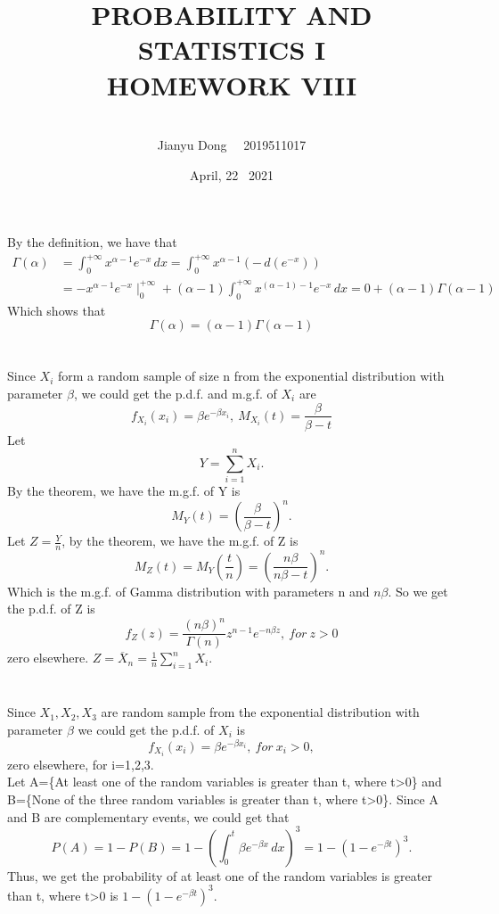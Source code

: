 \documentclass[10.5pt]{article}
\title{PROBABILITY AND STATISTICS I
\\HOMEWORK VIII}
\author{\\Jianyu Dong   ~~2019511017}
\date{April, 22~ 2021}
\begin{document}
    
\maketitle
\newpage

\section{}
By the definition, we have that $$\begin{aligned}
    \Gamma(\alpha)&=\int_0^{+\infty}x^{\alpha-1}e^{-x}\,dx=\int_0^{+\infty}x^{\alpha-1}(-\,d(e^{-x}))\\
    &=-x^{\alpha-1}e^{-x}\mid_0^{+\infty}+(\alpha-1)\int_0^{+\infty}x^{(\alpha-1)-1}e^{-x}\,dx=0+(\alpha-1)\Gamma(\alpha-1)
\end{aligned}$$\indent
Which shows that $$\Gamma(\alpha)=(\alpha-1)\Gamma(\alpha-1)$$

\section{}
Since $X_i$ form a random sample of size n from the exponential distribution with parameter $\beta$, we could get the p.d.f. and m.g.f. of $X_i$ are $$f_{X_i}(x_i)=\beta e^{-\beta x_i},~M_{X_i}(t)=\frac{\beta}{\beta -t}$$\indent
Let $$Y=\sum_{i=1}^nX_i.$$\indent
By the theorem, we have the m.g.f. of Y is $$M_Y(t)=\left(\frac{\beta}{\beta -t}\right)^n.$$\indent
Let $Z=\frac{Y}{n}$, by the theorem, we have the m.g.f. of Z is $$M_Z(t)=M_Y(\frac{t}{n})=\left(\frac{n\beta}{n\beta -t}\right)^n.$$\indent
Which is the m.g.f. of Gamma distribution with parameters n and $n\beta$. So we get the p.d.f. of Z is $$f_Z(z)=\frac{(n\beta)^n}{\Gamma(n)}z^{n-1}e^{-n\beta z},~for ~z>0$$\indent
zero elsewhere. $Z=\overline{X}_n=\frac{1}{n}\sum_{i=1}^nX_i$.

\section{}
Since $X_1,X_2,X_3$ are random sample from the exponential distribution with parameter $\beta$ we could get the p.d.f. of $X_i$ is $$f_{X_i}(x_i)=\beta e^{-\beta x_i},~for ~x_i>0,$$\indent
zero elsewhere, for i=1,2,3.\\\indent
Let A=\{At least one of the random variables is greater than t, where t>0\} and B=\{None of the three random variables is greater than t, where t>0\}. Since A and B are complementary events, we could get that $$P(A)=1-P(B)=1-\left(\int_0^t\beta e^{-\beta x}\,dx\right)^3=1-\left(1-e^{-\beta t}\right)^3.$$\indent
Thus, we get the probability of at least one of the random variables is greater than t, where t>0 is $1-\left(1-e^{-\beta t}\right)^3$.
\end{document}
